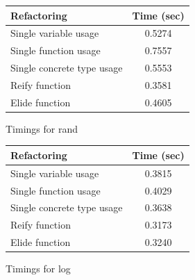\begin{figure}[H]
\centering
\begin{minipage}{.5\textwidth}
  \begin{center}
    \begin{tabular}{ | l | c |}
    \hline
    \textbf{Refactoring} & \textbf{Time (sec)} \\ \hline
    Single variable usage &  0.5274 \\ \hline
    Single function usage &  0.7557 \\ \hline
    Single concrete type usage  & 0.5553 \\ \hline
    Reify function &   0.3581 \\ \hline
    Elide function & 0.4605 \\ \hline
    \end{tabular}
\end{center}

\caption{Timings for rand}
\label{Fig:rand}
\end{minipage}%
\begin{minipage}{.5\textwidth}
\begin{center}
    \begin{tabular}{ | l | c |}
    \hline
    \textbf{Refactoring} & \textbf{Time (sec)} \\ \hline
    Single variable usage &  0.3815  \\ \hline
    Single function usage &   0.4029  \\ \hline
    Single concrete type usage  &  0.3638 \\ \hline
    Reify function &   0.3173 \\ \hline
    Elide function &  0.3240 \\ \hline
    \end{tabular}
\end{center}

\caption{Timings for log}
\label{Fig:log}
\end{minipage}
\end{figure}

